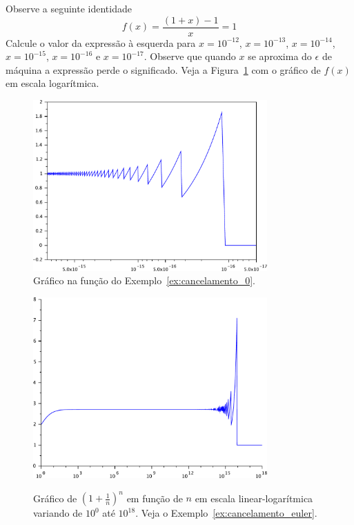 \begin{ex}\label{ex:cancelamento_0}Observe a seguinte identidade
$$
f(x)=\frac{(1+x)-1}{x}=1
$$
Calcule o valor da expressão à esquerda para $x=10^{-12}$, $x=10^{-13}$, $x=10^{-14}$, $x=10^{-15}$, $x=10^{-16}$ e $x=10^{-17}$. Observe que quando $x$ se aproxima do $\epsilon$ de máquina a expressão perde o significado. Veja a Figura~\ref{fig:cancelamento_0} com o gráfico de $f(x)$ em escala logarítmica.
\end{ex}

\begin{figure}
  \centering
  \includegraphics[width=0.8\textwidth]{./cap_aritmetica/pics/cancelamento_0}
  \caption{Gráfico na função do Exemplo~\ref{ex:cancelamento_0}.}
  \label{fig:cancelamento_0}
\end{figure}


\begin{figure}
  \includegraphics[width=0.8\textwidth]{./cap_aritmetica/pics/cancelamento_euler}
  \label{fig:cancelamento_euler}
  \caption{Gráfico de $\left(1+\frac{1}{n}\right)^n$ em função de $n$ em escala linear-logarítmica variando de $10^0$ até $10^{18}$. Veja o Exemplo~\ref{ex:cancelamento_euler}.}
\end{figure}

